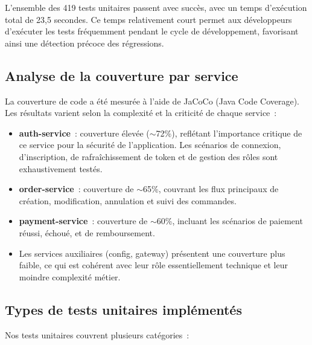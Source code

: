 L'ensemble des 419 tests unitaires passent avec succ\`{e}s, avec un temps
d'ex\'{e}cution total de 23,5 secondes. Ce temps relativement court permet
aux d\'{e}veloppeurs d'ex\'{e}cuter les tests fr\'{e}quemment pendant le cycle de
d\'{e}veloppement, favorisant ainsi une d\'{e}tection pr\'{e}coce des r\'{e}gressions.

\subsection{Analyse de la couverture par service}

La couverture de code a \'{e}t\'{e} mesur\'{e}e \`{a} l'aide de JaCoCo (Java Code
Coverage). Les r\'{e}sultats varient selon la complexit\'{e} et la criticit\'{e}
de chaque service~:

\begin{itemize}[leftmargin=*]
  \item \textbf{auth-service}~: couverture \'{e}lev\'{e}e ($\sim$72\%), refl\'{e}tant
    l'importance critique de ce service pour la s\'{e}curit\'{e} de l'application.
    Les sc\'{e}narios de connexion, d'inscription, de rafra\^{i}chissement de
    token et de gestion des r\^{o}les sont exhaustivement test\'{e}s.
  \item \textbf{order-service}~: couverture de $\sim$65\%, couvrant les flux
    principaux de cr\'{e}ation, modification, annulation et suivi des commandes.
  \item \textbf{payment-service}~: couverture de $\sim$60\%, incluant les
    sc\'{e}narios de paiement r\'{e}ussi, \'{e}chou\'{e}, et de remboursement.
  \item Les services auxiliaires (config, gateway) pr\'{e}sentent une
    couverture plus faible, ce qui est coh\'{e}rent avec leur r\^{o}le
    essentiellement technique et leur moindre complexit\'{e} m\'{e}tier.
\end{itemize}

\subsection{Types de tests unitaires impl\'{e}ment\'{e}s}

Nos tests unitaires couvrent plusieurs cat\'{e}gories~:

